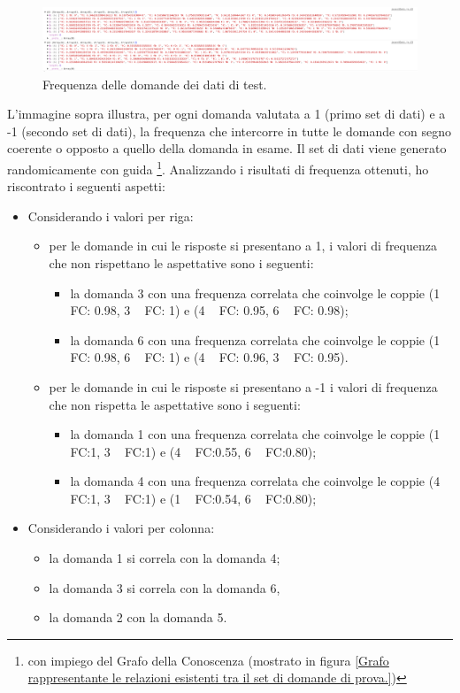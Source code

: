 \noindent
\begin{figure}[H]
\centering
	\includegraphics[width=1\linewidth]{./image/res_frequenceMatrix_OSS.png}
	\caption{Frequenza delle domande dei dati di test.}
	\label{Frequenza delle domande dei dati di test.}
\end{figure}
\noindent
L'immagine sopra illustra, per ogni domanda valutata a 1 (primo set di dati) e a -1 (secondo set di dati), la frequenza che intercorre in tutte le domande con segno coerente o opposto a quello della domanda in esame.
Il set di dati viene generato randomicamente con guida \footnote{con impiego del Grafo della Conoscenza (mostrato in figura \ref{Grafo rappresentante le relazioni esistenti tra il set di domande di prova.})}.
Analizzando i risultati di frequenza ottenuti, ho riscontrato i seguenti aspetti:
\begin{itemize}
\item Considerando i valori per riga:
\begin{itemize}
\item per le domande in cui le risposte si presentano a 1, i valori di frequenza che non rispettano le aspettative sono i seguenti:
\begin{itemize}
\item la domanda 3  con una frequenza correlata che coinvolge le coppie (1 ~ FC: 0.98, 3 ~ FC: 1) e (4 ~ FC: 0.95, 6 ~ FC: 0.98);
\item la domanda 6 con una frequenza correlata che coinvolge le coppie (1 ~ FC: 0.98, 6 ~ FC: 1) e (4 ~ FC: 0.96, 3 ~ FC: 0.95).
\end{itemize}
\item per le domande in cui le risposte si presentano a -1 i valori di frequenza che non rispetta le aspettative sono i seguenti:
\begin{itemize}
\item la domanda 1 con una frequenza correlata che coinvolge le coppie (1 ~ FC:1, 3 ~ FC:1) e (4 ~ FC:0.55, 6 ~ FC:0.80);
\item la domanda 4 con una frequenza correlata che coinvolge le coppie (4 ~ FC:1, 3 ~ FC:1) e (1 ~ FC:0.54, 6 ~ FC:0.80);
\end{itemize}
\end{itemize}
\item Considerando i valori per colonna:
\begin{itemize}
\item la domanda 1 si correla con la domanda 4;
\item la domanda 3 si correla con la domanda 6, 
\item la domanda 2 con la domanda 5.
\end{itemize}
\end{itemize}
